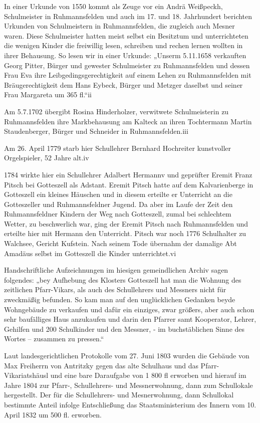 \documentclass{book}
\begin{document}
In einer Urkunde von 1550 kommt als Zeuge vor ein Andrä Weißpeckh, Schulmeister
in Ruhmannsfelden und auch im 17. und 18. Jahrhundert berichten Urkunden von
Schulmeistern in Ruhmannsfelden, die zugleich auch Mesner waren. Diese
Schulmeister hatten meist selbst ein Besitztum und unterrichteten die wenigen
Kinder die freiwillig lesen, schreiben und rechen lernen wollten in ihrer
Behausung. So lesen wir in einer Urkunde: „Unserm 5.11.1658 verkauften Georg
Pitter, Bürger und gewester Schulmeister zu Ruhmannsfelden und dessen Frau Eva
ihre Leibgedingsgerechtigkeit auf einem Lehen zu Ruhmannsfelden mit
Bräugerechtigkeit dem Hans Eybeck, Bürger und Metzger daselbst und seiner Frau
Margareta um 365 fl.“ii

Am 5.7.1702 übergibt Rosina Hinderholzer, verwitwete Schulmeisterin zu
Ruhmannsfelden ihre Markbehausung am Kalteck an ihren Tochtermann Martin
Staudenberger, Bürger und Schneider in Ruhmannsfelden.iii

Am 26. April 1779 starb hier Schullehrer Bernhard Hochreiter kunstvoller
Orgelspieler, 52 Jahre alt.iv

1784 wirkte hier ein Schullehrer Adalbert Hermannv und geprüfter Eremit Franz
Pitsch bei Gotteszell als Adstant. Eremit Pitsch hatte auf dem Kalvarienberge in
Gotteszell ein kleines Häuschen und in diesem erteilte er Unterricht an die
Gotteszeller und Ruhmannsfeldner Jugend. Da aber im Laufe der Zeit den
Ruhmannsfeldner Kindern der Weg nach Gotteszell, zumal bei schlechtem Wetter, zu
beschwerlich war, ging der Eremit Pitsch nach Ruhmannsfelden und erteilte hier
mit Hermann den Unterricht. Pitsch war noch 1776 Schulhalter zu Walchsee,
Gericht Kufstein. Nach seinem Tode übernahm der damalige Abt Amadäus selbst im
Gotteszell die Kinder unterrichtet.vi

Handschriftliche Aufzeichnungen im hiesigen gemeindlichen Archiv sagen
folgendes: „bey Aufhebung des Klosters Gotteszell hat man die Wohnung des
zeitlichen Pfarr-Vikars, als auch des Schullehrers und Messners nicht für
zweckmäßig befunden. So kam man auf den unglücklichen Gedanken beyde Wohngebäude
zu verkaufen und dafür ein einziges, zwar größers, aber auch schon sehr
baufälliges Haus anzukaufen und darin den Pfarrer samt Kooperator, Lehrer,
Gehilfen und 200 Schulkinder und den Messner, - im buchstäblichen Sinne des
Wortes – zusammen zu pressen.“

Laut landesgerichtlichen Protokolle vom 27. Juni 1803 wurden die Gebäude von Max
Freiherrn von Antritzky gegen das alte Schulhaus und das Pfarr-Vikariatshäusl
und eine bare Daraufgabe von 1 800 fl erworben und hierauf im Jahre 1804 zur
Pfarr-, Schullehrers- und Messnerwohnung, dann zum Schullokale hergestellt. Der
für die Schullehrers- und Mesnerwohnung, dann Schullokal bestimmte Anteil
infolge Entschließung das Staatsministerium des Innern vom 10. April 1832 um 500
fl. erworben.
\end{document}
